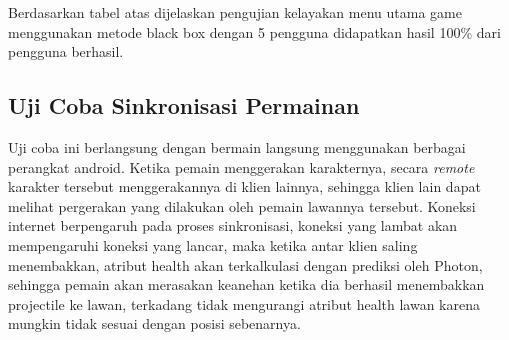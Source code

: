     Berdasarkan tabel atas dijelaskan pengujian kelayakan menu utama game menggunakan 
metode black box dengan 5 pengguna didapatkan hasil 100\% dari pengguna 
berhasil.
\newpage
\subsection{Uji Coba Sinkronisasi Permainan}
\noindent

Uji coba ini berlangsung dengan bermain langsung menggunakan berbagai perangkat android. Ketika pemain menggerakan karakternya, secara \textit{remote} karakter tersebut menggerakannya di klien lainnya, sehingga klien lain dapat melihat pergerakan yang dilakukan oleh pemain lawannya tersebut. Koneksi internet berpengaruh pada proses sinkronisasi, koneksi yang lambat akan mempengaruhi koneksi yang lancar, maka ketika antar klien saling menembakkan, atribut health akan 
terkalkulasi dengan prediksi oleh Photon, sehingga pemain akan 
merasakan keanehan ketika dia berhasil menembakkan projectile
ke lawan, terkadang tidak mengurangi atribut health lawan karena 
mungkin tidak sesuai dengan posisi sebenarnya.

